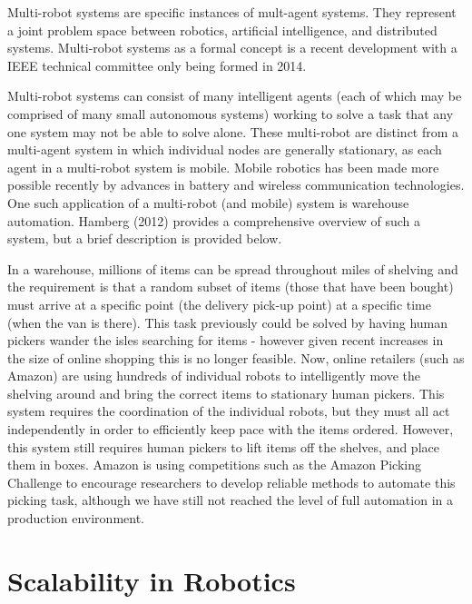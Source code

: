 \documentclass[../dissertation.tex]{subfiles}
\begin{document}
Multi-robot systems are specific instances of mult-agent systems. They represent a joint problem space between robotics, artificial intelligence, and distributed systems. Multi-robot systems as a formal concept is a recent development with a IEEE technical committee only being formed in 2014\cite{MultiRobotSystemsIEEECommittee}.

Multi-robot systems can consist of many intelligent agents (each of which may be comprised of many small autonomous systems) working to solve a task that any one system may not be able to solve alone. These multi-robot are distinct from a multi-agent system in which individual nodes are generally stationary, as each agent in a multi-robot system is mobile\cite{doi:10.5772/57313}. Mobile robotics has been made more possible recently by advances in battery\cite{estrin2002connecting} and wireless communication\cite{cordeiro2010ieee} technologies. One such application of a multi-robot (and mobile) system is warehouse automation. Hamberg (2012)\cite{hamberg2012automation} provides a comprehensive overview of such a system, but a brief description is provided below.

In a warehouse, millions of items can be spread throughout miles of shelving and the requirement is that a random subset of items (those that have been bought) must arrive at a specific point (the delivery pick-up point) at a specific time (when the van is there). This task previously could be solved by having human pickers wander the isles searching for items - however given recent increases in the size of online shopping this is no longer feasible. Now, online retailers (such as Amazon) are using hundreds of individual robots to intelligently move the shelving around and bring the correct items to stationary human pickers\cite{wurman2008coordinating}. This system requires the coordination of the individual robots, but they must all act independently in order to efficiently keep pace with the items ordered. However, this system still requires human pickers to lift items off the shelves, and place them in boxes. Amazon is using competitions such as the Amazon Picking Challenge to encourage researchers to develop reliable methods to automate this picking task\cite{correll2016lessons}, although we have still not reached the level of full automation in a production environment.

\section{Scalability in Robotics}
\label{background-scalability}
\end{document}
